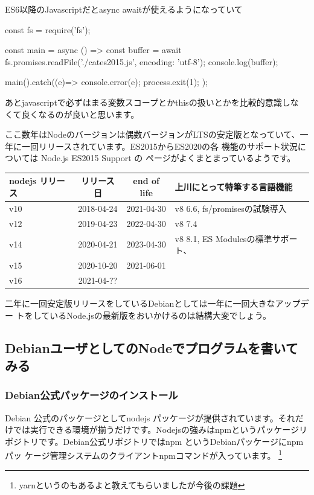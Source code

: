 \documentclass[mingoth,a4paper]{jsarticle}
\begin{document}
ES6以降のJavascriptだとasync awaitが使えるようになっていて

\begin{commandline}
const fs  = require('fs');

const main = async () => {
    const buffer = await fs.promises.readFile('./cates2015.js',
					      {encoding: 'utf-8'});
    console.log(buffer);
}

main().catch((e)=>{
    console.error(e);
    process.exit(1);
});

\end{commandline}

あとjavascriptで必ずはまる変数スコープとかthisの扱いとかを比較的意識しな
くて良くなるのが良いと思います。

ここ数年はNodeのバージョンは偶数バージョンがLTSの安定版となっていて、一
年に一回リリースされています\cite{nodejsreleases}。ES2015からES2020の各
機能のサポート状況については Node.js ES2015 Support \cite{node-green}の
ページがよくまとまっているようです。

\begin{tabular}{|l|c|c|l|}
\hline
nodejs リリース & リリース日 & end of life & 上川にとって特筆する言語機能\\
\hline
v10 & 2018-04-24 & 2021-04-30 & v8 6.6, fs/promisesの試験導入 \\
v12 & 2019-04-23 & 2022-04-30 & v8 7.4\\
v14 & 2020-04-21 & 2023-04-30 & v8 8.1, ES Modulesの標準サポート、 \\
v15 & 2020-10-20 & 2021-06-01 &  \\
v16 & 2021-04-?? &            &  \\
\hline
\end{tabular}

二年に一回安定版リリースをしているDebianとしては一年に一回大きなアップデー
トをしているNode.jsの最新版をおいかけるのは結構大変でしょう。

\subsection{DebianユーザとしてのNodeでプログラムを書いてみる}

\subsubsection{Debian公式パッケージのインストール}


Debian 公式のパッケージとしてnodejs パッケージが提供されています。それだ
けでは実行できる環境が揃うだけです。Nodejsの強みはnpmというパッケージリ
ポジトリです。Debian公式リポジトリではnpm というDebianパッケージにnpmパッ
ケージ管理システムのクライアントnpmコマンドが入っています。
\footnote{yarnというのもあるよと教えてもらいましたが今後の課題}
\end{document}
